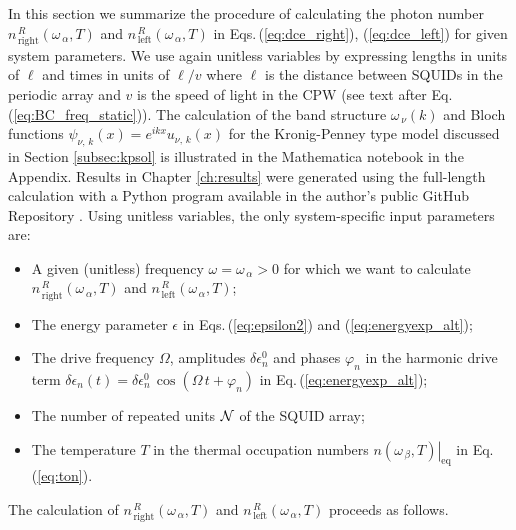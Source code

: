 \noindent
In this section we summarize the procedure of calculating the photon number 
$n_{\,\text{right}}^{\,R}(\omega_{\,\alpha}, T)$ and 
$n_{\,\text{left}}^{\,R}(\omega_{\,\alpha}, T)$ 
in Eqs.\,(\ref{eq:dce_right}), (\ref{eq:dce_left})
for given system parameters. 
We use again unitless variables 
by expressing lengths in units of $\ell$
and times in units of $\ell/v$ where $\ell$ is the distance between SQUIDs in the periodic array
and $v$ is the speed of light in the CPW (see text after Eq.\,(\ref{eq:BC_freq_static})). 
The calculation of the band structure $\omega_{\,\nu}(k)$
and Bloch functions $\psi_{\nu,\,k}(x) = e^{i k x} u_{\nu,\,k}(x)$ for the 
Kronig-Penney type model discussed in Section \ref{subsec:kpsol} is 
illustrated in the Mathematica notebook in the Appendix. Results in Chapter \ref{ch:results} were generated using the full-length calculation with a Python program available in the author's public GitHub Repository \cite{Github_Repository}.
%
Using unitless variables, the only system-specific input parameters are:
%
\begin{itemize}
%
\item A given (unitless) frequency 
$\omega = \omega_{\,\alpha} > 0$ for which we want to calculate 
$n_{\,\text{right}}^{\,R}(\omega_{\,\alpha}, T)$ and 
$n_{\,\text{left}}^{\,R}(\omega_{\,\alpha}, T)$;
%
\item The energy parameter $\epsilon$ in Eqs.\,(\ref{eq:epsilon2}) and (\ref{eq:energyexp_alt});
%
\item The drive frequency $\Omega$, amplitudes $\delta \epsilon_n^0$ and 
phases $\varphi_n$ in the harmonic drive term 
$\delta \epsilon_n(t) = \delta \epsilon_n^0 \, \cos(\Omega \, t + \varphi_n)$
in Eq.\,(\ref{eq:energyexp_alt});

\item The number of repeated units ${\cal N}$ of the SQUID array;

\item The temperature $T$ in the thermal occupation numbers 
$\left. n(\omega_{\,\beta}, T) \right|_{\text{eq}}$ in Eq.\,(\ref{eq:ton}).
%
\end{itemize}

\noindent
The calculation of 
$n_{\,\text{right}}^{\,R}(\omega_{\,\alpha}, T)$ and 
$n_{\,\text{left}}^{\,R}(\omega_{\,\alpha}, T)$ proceeds as follows. 


